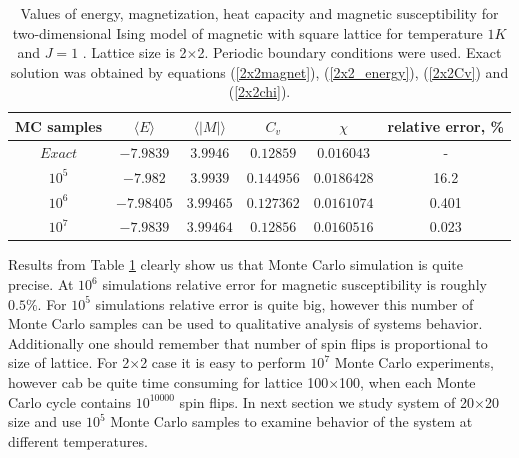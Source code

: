\documentclass[10pt]{article}
\begin{document}
\begin{table}[h!]
  \caption{Values of energy, magnetization, heat capacity and magnetic susceptibility for two-dimensional Ising model of magnetic with square lattice for temperature $1K$ and $J=1$ . Lattice size is 2$\times$2. Periodic boundary conditions were used. Exact solution was obtained by equations (\ref{2x2magnet}), (\ref{2x2_energy}), (\ref{2x2Cv}) and (\ref{2x2chi}). }
  \label{tab:2x2_compare}
  \begin{center}
    \begin{tabular}{c|c|c|c|c|c}
    \hline
		MC samples & $\langle E\rangle$ & $\langle \left\vert M\right\vert \rangle$ & $C_{v}$ & $\chi$ & relative error, \% \\
        \hline
	$	Exact $ & $-7.9839$ & $ 3.9946 $ & $ 0.12859 $ & $ 0.016043 $ & - \\
	$	10^5 $  & $-7.982$ & $ 3.9939 $ & $ 0.144956 $ & $ 0.0186428 $ & 16.2 \\
	$	10^6 $  & $-7.98405$ & $ 3.99465 $ & $ 0.127362 $ & $ 0.0161074 $ & 0.401 \\
	$	10^7 $  & $-7.9839$ & $ 3.99464 $ & $ 0.12856 $ & $ 0.0160516 $ & 0.023 \\

	\end{tabular}
  \end{center}
\end{table}

Results from Table \ref{tab:2x2_compare} clearly show us that Monte Carlo simulation is quite precise. At $10^6$ simulations relative error for magnetic susceptibility is roughly $0.5 \%$. For $10^5$ simulations relative error is quite big, however this number of Monte Carlo samples can be used to qualitative analysis of systems behavior. Additionally one should remember that number of spin flips is proportional to size of lattice. For 2$\times$2 case it is easy to perform $10^7$ Monte Carlo experiments, however cab be quite time consuming for lattice 100$\times$100, when each Monte Carlo cycle contains $10^10000$ spin flips. 
In next section we study system of 20$\times$20 size and use $10^5$ Monte Carlo samples to examine behavior of the system at different temperatures. 
\end{document}
